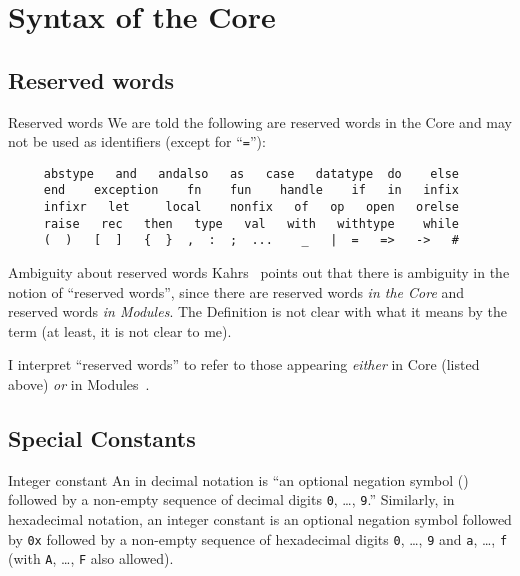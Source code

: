 \chapter{Syntax of the Core}

\section{Reserved words}

\begin{definition}{Reserved words}\label{defn:reserved-words}
We are told the following are reserved words in the Core and may not be
used as identifiers (except for ``\texttt{=}''):
\vspace*{-6pt}
\begin{verbatim}
     abstype   and   andalso   as   case   datatype  do    else
     end    exception    fn    fun    handle    if   in   infix
     infixr   let     local    nonfix   of   op   open   orelse
     raise   rec   then   type   val   with   withtype    while
     (  )   [  ]   {  }  ,  :  ;  ...    _   |  =   =>   ->   #   
\end{verbatim}
\end{definition}

\begin{remark}{Ambiguity about reserved words}
Kahrs~\cite{kahrs1993mistakes} points out that there is ambiguity in the
notion of ``reserved words'', since there are reserved words \emph{in
the Core} and reserved words \emph{in Modules}. The Definition is not
clear with what it means by the term (at least, it is not clear to me).

I interpret ``reserved words'' to refer to those appearing \emph{either}
in Core (listed above) \emph{or} in Modules~.
\end{remark}

\section{Special Constants}\label{sec:ch2:special-constant}

\begin{definition}{Integer constant}
An  in decimal notation is ``an optional
negation symbol (\tttilde) followed by a non-empty sequence of decimal
digits \texttt{0}, \dots, \texttt{9}.'' Similarly, in hexadecimal
notation, an integer constant is an optional negation symbol followed by
\texttt{0x} followed by a non-empty sequence of hexadecimal digits
\texttt{0}, \dots, \texttt{9} and \texttt{a}, \dots, \texttt{f} (with
\texttt{A}, \dots, \texttt{F} also allowed).
\end{definition}

